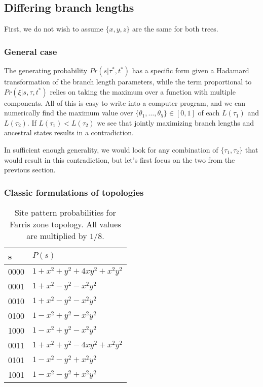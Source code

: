 \subsection{Differing branch lengths}

First, we do not wish to assume $\{x,y,z\}$ are the same for both trees.

\subsubsection{General case}

The generating probability $Pr(s | \tau^*, t^*)$ has a specific form given a Hadamard transformation of the branch length parameters, while the term proportional to $Pr(\xi | s, \tau, t^*)$ relies on taking the maximum over a function with multiple components.
All of this is easy to write into a computer program, and we can numerically find the maximum value over $\{\theta_1, \ldots, \theta_5\}\in[0,1]$ of each $L(\tau_1)$ and $L(\tau_2)$.
If $L(\tau_1) < L(\tau_2)$ we see that jointly maximizing branch lengths and ancestral states results in a contradiction.

In sufficient enough generality, we would look for any combination of $\{\tau_1,\tau_2\}$ that would result in this contradiction, but let's first focus on the two from the previous section.

\subsubsection{Classic formulations of topologies}

\begin{table}
\centering
\begin{tabular}{|l|l|}
    \hline
s   &$P(s)$\\
    \hline
0000&$1+x^2+y^2+4xy^2+x^2y^2$\\
0001&$1+x^2-y^2-x^2y^2$\\
0010&$1+x^2-y^2-x^2y^2$\\
0100&$1-x^2+y^2-x^2y^2$\\
1000&$1-x^2+y^2-x^2y^2$\\
0011&$1+x^2+y^2-4xy^2+x^2y^2$\\
0101&$1-x^2-y^2+x^2y^2$\\
1001&$1-x^2-y^2+x^2y^2$\\
    \hline
\end{tabular}    
\caption{Site pattern probabilities for Farris zone topology.
All values are multiplied by $1/8$.}
\end{table}

